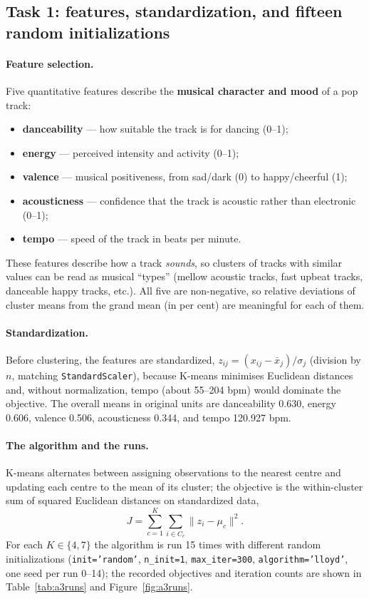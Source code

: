 \documentclass[11pt,letterpaper]{article}
\begin{document}
\subsection{Task 1: features, standardization, and fifteen random initializations}\label{sec:a3t1}

\paragraph{Feature selection.}
Five quantitative features describe the \textbf{musical character and mood}
of a pop track:
\begin{itemize}
  \item \textbf{danceability} --- how suitable the track is for dancing (0--1);
  \item \textbf{energy} --- perceived intensity and activity (0--1);
  \item \textbf{valence} --- musical positiveness, from sad/dark (0) to
        happy/cheerful (1);
  \item \textbf{acousticness} --- confidence that the track is acoustic
        rather than electronic (0--1);
  \item \textbf{tempo} --- speed of the track in beats per minute.
\end{itemize}
These features describe how a track \emph{sounds}, so clusters of tracks with
similar values can be read as musical ``types'' (mellow acoustic tracks, fast
upbeat tracks, danceable happy tracks, etc.). All five are non-negative, so
relative deviations of cluster means from the grand mean (in per cent) are
meaningful for each of them.

\paragraph{Standardization.}
Before clustering, the features are standardized,
$z_{ij} = (x_{ij}-\bar{x}_j)/\sigma_j$ (division by $n$, matching
\texttt{StandardScaler}), because K-means minimises Euclidean distances and,
without normalization, tempo (about 55--204 bpm) would dominate the
objective. The overall means in original units are danceability 0.630, energy
0.606, valence 0.506, acousticness 0.344, and tempo 120.927 bpm.

\paragraph{The algorithm and the runs.}
K-means \citep{macqueen} alternates between assigning observations to the
nearest centre and updating each centre to the mean of its cluster; the
objective is the within-cluster sum of squared Euclidean distances on
standardized data,
\begin{equation}
  J = \sum_{c=1}^{K}\sum_{i\in C_c} \lVert z_i - \mu_c \rVert^2 .
\end{equation}
For each $K\in\{4,7\}$ the algorithm is run 15 times with different random
initializations (\texttt{init='random'}, \texttt{n\_init=1},
\texttt{max\_iter=300}, \texttt{algorithm='lloyd'}, one seed per run
0--14); the recorded objectives and iteration counts are shown in
Table~\ref{tab:a3runs} and Figure~\ref{fig:a3runs}.
\end{document}
